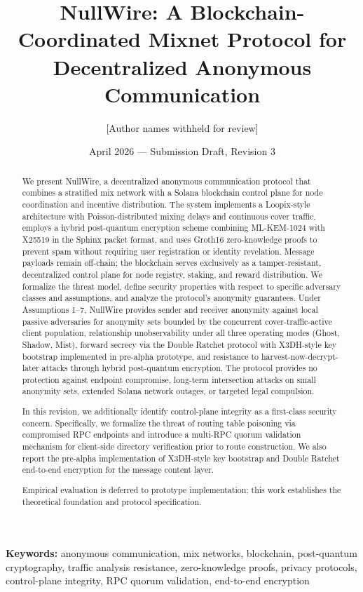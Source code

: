 \documentclass[11pt]{article}
\title{\textbf{NullWire: A Blockchain-Coordinated Mixnet Protocol for Decentralized Anonymous Communication}}
\author{[Author names withheld for review]}
\date{April 2026 --- Submission Draft, Revision 3}
\theoremstyle{definition}
\theoremstyle{remark}
\begin{document}
\maketitle

\begin{abstract}
We present NullWire, a decentralized anonymous communication protocol that combines a stratified mix network with a Solana blockchain control plane for node coordination and incentive distribution. The system implements a Loopix-style architecture with Poisson-distributed mixing delays and continuous cover traffic, employs a hybrid post-quantum encryption scheme combining ML-KEM-1024 with X25519 in the Sphinx packet format, and uses Groth16 zero-knowledge proofs to prevent spam without requiring user registration or identity revelation. Message payloads remain off-chain; the blockchain serves exclusively as a tamper-resistant, decentralized control plane for node registry, staking, and reward distribution. We formalize the threat model, define security properties with respect to specific adversary classes and assumptions, and analyze the protocol's anonymity guarantees. Under Assumptions 1--7, NullWire provides sender and receiver anonymity against local passive adversaries for anonymity sets bounded by the concurrent cover-traffic-active client population, relationship unobservability under all three operating modes (Ghost, Shadow, Mist), forward secrecy via the Double Ratchet protocol with X3DH-style key bootstrap implemented in pre-alpha prototype, and resistance to harvest-now-decrypt-later attacks through hybrid post-quantum encryption. The protocol provides no protection against endpoint compromise, long-term intersection attacks on small anonymity sets, extended Solana network outages, or targeted legal compulsion.

In this revision, we additionally identify control-plane integrity as a first-class security concern. Specifically, we formalize the threat of routing table poisoning via compromised RPC endpoints and introduce a multi-RPC quorum validation mechanism for client-side directory verification prior to route construction. We also report the pre-alpha implementation of X3DH-style key bootstrap and Double Ratchet end-to-end encryption for the message content layer.

Empirical evaluation is deferred to prototype implementation; this work establishes the theoretical foundation and protocol specification.
\end{abstract}

\noindent\textbf{Keywords:} anonymous communication, mix networks, blockchain, post-quantum cryptography, traffic analysis resistance, zero-knowledge proofs, privacy protocols, control-plane integrity, RPC quorum validation, end-to-end encryption
\end{document}
